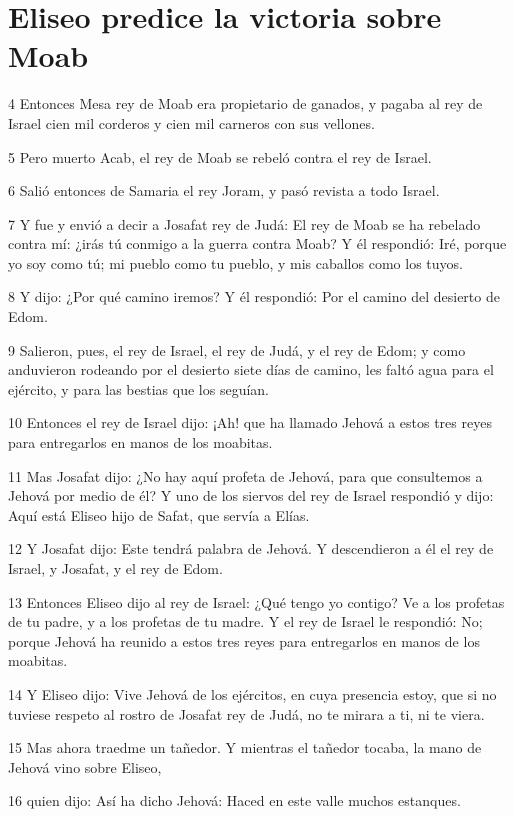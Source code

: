 \section*{Eliseo predice la victoria sobre Moab}

\par 4 Entonces Mesa rey de Moab era propietario de ganados, y pagaba al rey de Israel cien mil corderos y cien mil carneros con sus vellones.
\par 5 Pero muerto Acab, el rey de Moab se rebeló contra el rey de Israel.
\par 6 Salió entonces de Samaria el rey Joram, y pasó revista a todo Israel.
\par 7 Y fue y envió a decir a Josafat rey de Judá: El rey de Moab se ha rebelado contra mí: ¿irás tú conmigo a la guerra contra Moab? Y él respondió: Iré, porque yo soy como tú; mi pueblo como tu pueblo, y mis caballos como los tuyos.
\par 8 Y dijo: ¿Por qué camino iremos? Y él respondió: Por el camino del desierto de Edom.
\par 9 Salieron, pues, el rey de Israel, el rey de Judá, y el rey de Edom; y como anduvieron rodeando por el desierto siete días de camino, les faltó agua para el ejército, y para las bestias que los seguían.
\par 10 Entonces el rey de Israel dijo: ¡Ah! que ha llamado Jehová a estos tres reyes para entregarlos en manos de los moabitas.
\par 11 Mas Josafat dijo: ¿No hay aquí profeta de Jehová, para que consultemos a Jehová por medio de él? Y uno de los siervos del rey de Israel respondió y dijo: Aquí está Eliseo hijo de Safat, que servía a Elías.
\par 12 Y Josafat dijo: Este tendrá palabra de Jehová. Y descendieron a él el rey de Israel, y Josafat, y el rey de Edom.
\par 13 Entonces Eliseo dijo al rey de Israel: ¿Qué tengo yo contigo? Ve a los profetas de tu padre, y a los profetas de tu madre. Y el rey de Israel le respondió: No; porque Jehová ha reunido a estos tres reyes para entregarlos en manos de los moabitas.
\par 14 Y Eliseo dijo: Vive Jehová de los ejércitos, en cuya presencia estoy, que si no tuviese respeto al rostro de Josafat rey de Judá, no te mirara a ti, ni te viera.
\par 15 Mas ahora traedme un tañedor. Y mientras el tañedor tocaba, la mano de Jehová vino sobre Eliseo,
\par 16 quien dijo: Así ha dicho Jehová: Haced en este valle muchos estanques.
